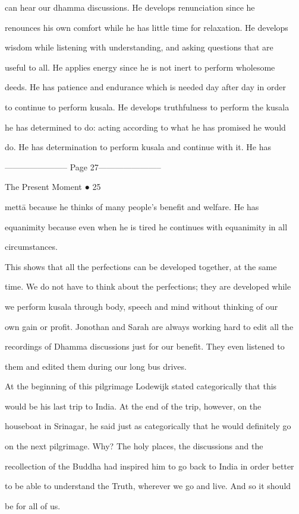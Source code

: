 can   hear   our   dhamma   discussions.   He   develops   renunciation   since   he  

renounces his own comfort while he has little time for relaxation. He develops  

wisdom   while   listening   with   understanding,   and   asking  questions   that   are  

useful  to  all.  He  applies  energy  since  he  is  not  inert  to  perform wholesome  

deeds. He has patience and endurance which is needed day after day in order  

to continue to perform kusala. He develops truthfulness to perform the kusala  

he has determined to do: acting according to what he has promised he would  

do.  He  has  determination   to  perform  kusala  and  continue  with   it.  He  has  


----------------------- Page 27-----------------------

                                                                    The Present Moment ● 25 



mettā   because   he   thinks   of   many   people’s   benefit   and   welfare.   He   has  

equanimity because even when he is tired he continues with equanimity in all  

circumstances. 

   This shows that  all the perfections can be developed together,  at the  same  

time. We do not have to think about the perfections; they are developed while  

we  perform  kusala  through body,  speech  and  mind without  thinking  of  our  

own gain or profit. Jonothan and Sarah are always working hard to edit all the  

recordings of Dhamma discussions just  for our benefit. They even listened to  

them and edited them during our long bus drives.  

   At the beginning  of  this  pilgrimage  Lodewijk  stated  categorically  that  this  

would   be   his   last   trip   to   India.   At   the   end   of   the   trip,   however,   on   the  

houseboat in Srinagar, he said just as categorically that he would definitely go  

on   the   next   pilgrimage.   Why?   The   holy   places,   the   discussions   and   the  

recollection of the Buddha had inspired him to go back to India in order better  

to be able to understand the Truth, wherever we go and live. And so it should  

be for all of us. 
